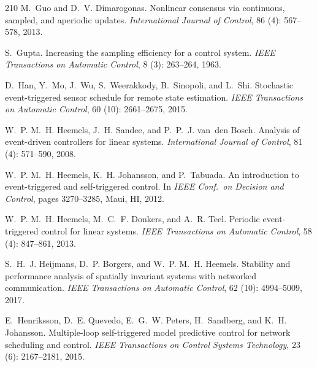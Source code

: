 \documentclass{autart}
\begin{document}
{\begin{thebibliography}{210}
M.~Guo and D.~V. Dimarogonas.
\newblock Nonlinear consensus via continuous, sampled, and aperiodic updates.
\newblock \emph{International Journal of Control}, 86 (4):
  567--578, 2013.

S.~Gupta.
\newblock Increasing the sampling efficiency for a control system.
\newblock \emph{IEEE Transactions on Automatic Control}, 8
  (3): 263--264, 1963.

D.~Han, Y.~Mo, J.~Wu, S.~Weerakkody, B.~Sinopoli, and L.~Shi.
\newblock Stochastic event-triggered sensor schedule for remote state
  estimation.
\newblock \emph{IEEE Transactions on Automatic Control}, 60
  (10): 2661--2675, 2015.

W.~P. M.~H. Heemels, J.~H. Sandee, and P.~P.~J. van~den Bosch.
\newblock Analysis of event-driven controllers for linear systems.
\newblock \emph{International Journal of Control}, 81 (4):
  571--590, 2008.

W.~P. M.~H. Heemels, K.~H. Johansson, and P.~Tabuada.
\newblock An introduction to event-triggered and self-triggered control.
\newblock In \emph{{IEEE} Conf.\ on Decision and Control}, pages 3270--3285,
  Maui, HI, 2012.

W.~P. M.~H. Heemels, M.~C.~F. Donkers, and A.~R. Teel.
\newblock Periodic event-triggered control for linear systems.
\newblock \emph{IEEE Transactions on Automatic Control}, 58
  (4): 847--861, 2013.

S.~H.~J. Heijmans, D.~P. Borgers, and W.~P. M.~H. Heemels.
\newblock Stability and performance analysis of spatially invariant systems
  with networked communication.
\newblock \emph{IEEE Transactions on Automatic Control}, 62
  (10): 4994--5009, 2017.

E.~Henriksson, D.~E. Quevedo, E.~G.~W. Peters, H.~Sandberg, and K.~H.
  Johansson.
\newblock Multiple-loop self-triggered model predictive control for network
  scheduling and control.
\newblock \emph{IEEE Transactions on Control Systems Technology}, 23
  (6): 2167--2181, 2015.


\end{thebibliography}}
\end{document}
